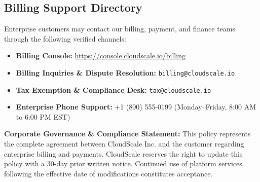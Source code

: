 \documentclass[10pt,letterpaper]{article}
\begin{document}
\subsection{Billing Support Directory}
Enterprise customers may contact our billing, payment, and finance teams through the following verified channels:
\begin{itemize}
  \item \textbf{Billing Console:} \url{https://console.cloudscale.io/billing}
  \item \textbf{Billing Inquiries \& Dispute Resolution:} \texttt{billing@cloudscale.io}
  \item \textbf{Tax Exemption \& Compliance Desk:} \texttt{tax@cloudscale.io}
  \item \textbf{Enterprise Phone Support:} +1 (800) 555-0199 (Monday--Friday, 8:00 AM to 6:00 PM EST)
\end{itemize}

\vspace{3pt}
\begin{tcolorbox}
\footnotesize
\textbf{Corporate Governance \& Compliance Statement:} This policy represents the complete agreement between CloudScale Inc. and the customer regarding enterprise billing and payments. CloudScale reserves the right to update this policy with a 30-day prior written notice. Continued use of platform services following the effective date of modifications constitutes acceptance.
\end{tcolorbox}
\end{document}
